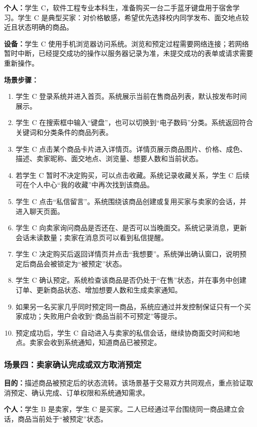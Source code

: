 ﻿\documentclass[UTF8,a4paper,12pt]{ctexart}
\begin{document}
\textbf{个人：}学生 C，软件工程专业本科生，准备购买一台二手蓝牙键盘用于宿舍学习。学生 C 是典型买家：对价格敏感，希望优先选择校内同学发布、面交地点较近且状态明确的商品。

\textbf{设备：}学生 C 使用手机浏览器访问系统。浏览和预定过程需要网络连接；若网络暂时中断，已经提交成功的操作以服务器记录为准，未提交成功的表单或请求需要重新操作。

\textbf{场景步骤：}
\begin{enumerate}
  \item 学生 C 登录系统并进入首页。系统展示当前在售商品列表，默认按发布时间展示。
  \item 学生 C 在搜索框中输入“键盘”，也可以切换到“电子数码”分类。系统返回符合关键词和分类条件的商品列表。
  \item 学生 C 点击某个商品卡片进入详情页。详情页展示商品图片、价格、成色、描述、卖家昵称、面交地点、浏览量、想要人数和当前状态。
  \item 若学生 C 暂时不决定购买，可以点击收藏。系统记录收藏关系，学生 C 后续可在个人中心“我的收藏”中再次找到该商品。
  \item 学生 C 点击“私信留言”。系统围绕该商品创建或复用买家与卖家的会话，并进入聊天页面。
  \item 学生 C 向卖家询问商品是否还在、是否可以当晚面交。系统记录消息，更新会话未读数量；卖家在消息页可以看到私信提醒。
  \item 学生 C 决定购买后返回详情页并点击“我想要”。系统弹出确认窗口，说明预定后商品会被锁定为“被预定”状态。
  \item 学生 C 确认预定。系统检查该商品是否仍处于“在售”状态，并在事务中创建订单、更新商品状态、增加想要人数和生成卖家通知。
  \item 如果另一名买家几乎同时预定同一商品，系统应通过并发控制保证只有一个买家成功；失败用户会收到“商品当前不可预定”等提示。
  \item 预定成功后，学生 C 自动进入与卖家的私信会话，继续协商面交时间和地点。卖家会收到系统通知，知道商品已被预定。
\end{enumerate}

\subsubsection{场景四：卖家确认完成或双方取消预定}
\textbf{目的：}描述商品被预定后的状态流转。该场景基于交易双方共同观点，重点验证取消预定、确认完成、订单权限和系统通知需求。

\textbf{个人：}学生 B 是卖家，学生 C 是买家。二人已经通过平台围绕同一商品建立会话，商品当前处于“被预定”状态。
\end{document}
